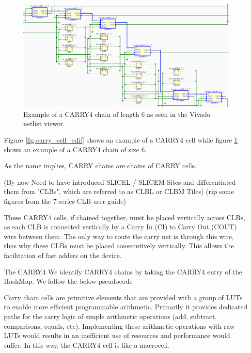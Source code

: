 \documentclass[twocolumn]{article}
\begin{document}
            \begin{figure}[t]
                \centering
                \includegraphics[width=\textwidth]{figures/carry_chain_edif.png}
                \caption{Example of a CARRY4 chain of length 6 as seen in the Vivado netlist viewer.}
                \label{fig:carry_chain_edif}
            \end{figure}

            Figure \ref{fig:carry_cell_edif} shows an example of a CARRY4 cell while figure \ref{fig:carry_chain_edif} shows an example of a CARRY4 chain of size 6. 

            As the name implies, CARRY chains are chains of CARRY cells. 


            (By now Need to have introduced SLICEL / SLICEM Sites and differentiated them from "CLBs", which are referred to as CLBL or CLBM Tiles)
            (rip some figures from the 7-series CLB user guide)

            These CARRY4 cells, if chained together, must be placed vertically across CLBs, as each CLB is connected vertically by a Carry In (CI) to Carry Out (COUT) wire between them. 
            The only way to route the carry net is through this wire, thus why these CLBs must be placed consecutively vertically. 
            This allows the facilitation of fast adders on the device. 

            The CARRY4 
            We identify CARRY4 chains by taking the CARRY4 entry of the HashMap. 
            We follow the below pseudocode 




            Carry chain cells are primitive elements that are provided with a group of LUTs to enable more efficient programmable arithmetic. 
            Primarily it provides dedicated paths for the carry logic of simple arithmetic operations (add, subtract, comparisons, equals, etc). Implementing these arithmetic operations with raw LUTs would results in an inefficient use of resources and performance would suffer. 
            In this way, the CARRY4 cell is like a macrocell. 
\end{document}
